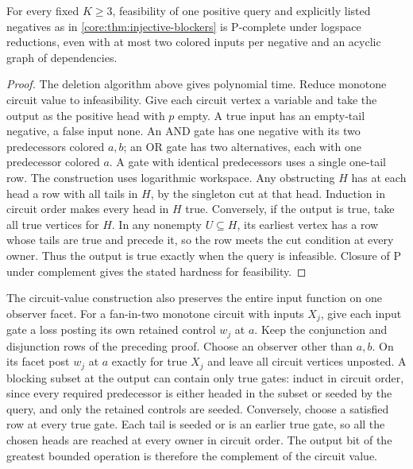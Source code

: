 \begin{corollary}\label{core:cor:guard-cut-complexity}
For every fixed $K\ge3$, feasibility of one positive query and
explicitly listed negatives as in \cref{core:thm:injective-blockers}
is $\mathrm P$-complete under logspace reductions, even with at most two
colored inputs per negative and an acyclic graph of dependencies.
\end{corollary}
\begin{proof}
The deletion algorithm above gives polynomial time. Reduce monotone
circuit value \cite{Goldschlager1977} to infeasibility. Give each
circuit vertex a variable and take the output as the positive head with
$p$ empty. A true input has an empty-tail negative, a false input none.
An AND gate has one negative with its two predecessors colored $a,b$;
an OR gate has two alternatives, each with one predecessor colored $a$.
A gate with identical predecessors uses a single one-tail row.
The construction uses logarithmic workspace. Any obstructing $H$ has
at each head a row with all tails in $H$, by the singleton cut at that
head. Induction in circuit order makes every head in $H$ true.
Conversely, if the output is true, take all true vertices for $H$.
In any nonempty $U\subseteq H$, its earliest vertex has a row whose
tails are true and precede it, so the row meets the cut condition at
every owner. Thus the output is true exactly when the query is
infeasible. Closure of $\mathrm P$ under complement gives the stated
hardness for feasibility.
\end{proof}

The circuit-value construction also preserves the entire
input function on one observer facet. For a fan-in-two
monotone circuit with inputs $X_j$, give each input gate
a loss posting its own retained control $w_j$ at $a$.
Keep the conjunction and disjunction rows of the
preceding proof. Choose an observer other than $a,b$.
On its facet post $w_j$ at $a$ exactly for true $X_j$
and leave all circuit vertices unposted. A blocking
subset at the output can contain only true gates:
induct in circuit order, since every required predecessor
is either headed in the subset or seeded by the query,
and only the retained controls are seeded. Conversely,
choose a satisfied row at every true gate. Each tail is
seeded or is an earlier true gate, so all the chosen
heads are reached at every owner in circuit order.
The output bit of the greatest bounded operation is
therefore the complement of the circuit value.

